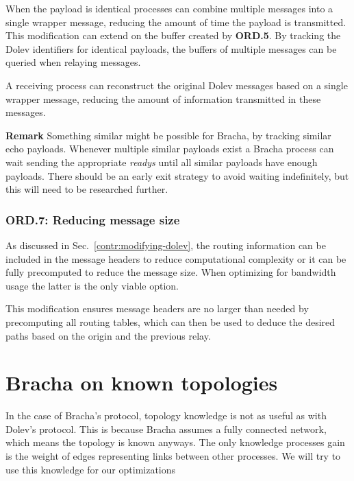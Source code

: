 When the payload is identical processes can combine multiple messages into a single wrapper message, reducing the amount of time the payload is transmitted. This modification can extend on the buffer created by \textbf{ORD.5}.
By tracking the Dolev identifiers for identical payloads, the buffers of multiple messages can be queried when relaying messages.

A receiving process can reconstruct the original Dolev messages based on a single wrapper message, reducing the amount of information transmitted in these messages.

\textbf{Remark}
Something similar might be possible for Bracha, by tracking similar echo payloads. Whenever multiple similar payloads exist a Bracha process can wait sending the appropriate \textit{readys} until all similar payloads have enough payloads. There should be an early exit strategy to avoid waiting indefinitely, but this will need to be researched further.




\subsubsection{ORD.7: Reducing message size}
As discussed in Sec.~\ref{contr:modifying-dolev}, the routing information can be included in the message headers to reduce computational complexity or it can be fully precomputed to reduce the message size. When optimizing for bandwidth usage the latter is the only viable option.

This modification ensures message headers are no larger than needed by precomputing all routing tables, which can then be used to deduce the desired paths based on the origin and the previous relay. 


\section{Bracha on known topologies}
\label{contr-bracha}
In the case of Bracha's protocol, topology knowledge is not as useful as with Dolev's protocol. This is because Bracha assumes a fully connected network, which means the topology is known anyways. The only knowledge processes gain is the weight of edges representing links between other processes. We will try to use this knowledge for our optimizations

